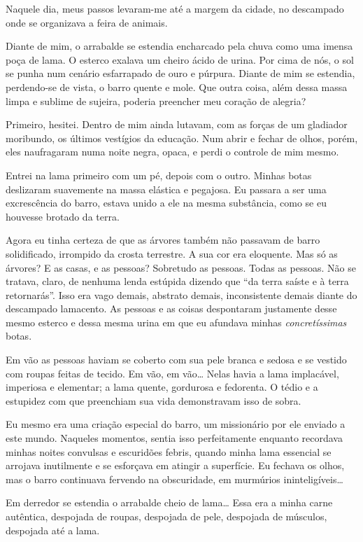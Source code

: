Naquele dia, meus passos levaram-me até a margem da cidade, no descampado onde se organizava a feira de animais.

Diante de mim, o arrabalde se estendia encharcado pela chuva como uma imensa poça de lama. O esterco exalava um cheiro ácido de urina. Por cima de nós, o sol se punha num cenário esfarrapado de ouro e púrpura. Diante de mim se estendia, perdendo-se de vista, o barro quente e mole. Que outra coisa, além dessa massa limpa e sublime de sujeira, poderia preencher meu coração de alegria?

Primeiro, hesitei. Dentro de mim ainda lutavam, com as forças de um gladiador moribundo, os últimos vestígios da educação. Num abrir e fechar de olhos, porém, eles naufragaram numa noite negra, opaca, e perdi o controle de mim mesmo.

Entrei na lama primeiro com um pé, depois com o outro. Minhas botas deslizaram suavemente na massa elástica e pegajosa. Eu passara a ser uma excrescência do barro, estava unido a ele na mesma substância, como se eu houvesse brotado da terra.

Agora eu tinha certeza de que as árvores também não passavam de barro solidificado, irrompido da crosta terrestre. A sua cor era eloquente. Mas só as árvores? E as casas, e as pessoas? Sobretudo as pessoas. Todas as pessoas. Não se tratava, claro, de nenhuma lenda estúpida dizendo que ``da terra saíste e à terra retornarás''. Isso era vago demais, abstrato demais, inconsistente demais diante do descampado lamacento. As pessoas e as coisas despontaram justamente desse mesmo esterco e dessa mesma urina em que eu afundava minhas \textit{concretíssimas} botas.

Em vão as pessoas haviam se coberto com sua pele branca e sedosa e se vestido com roupas feitas de tecido. Em vão, em vão\ldots{} Nelas havia a lama implacável, imperiosa e elementar; a lama quente, gordurosa e fedorenta. O tédio e a estupidez com que preenchiam sua vida demonstravam isso de sobra.

Eu mesmo era uma criação especial do barro, um missionário por ele enviado a este mundo. Naqueles momentos, sentia isso perfeitamente enquanto recordava minhas noites convulsas e escuridões febris, quando minha lama essencial se arrojava inutilmente e se esforçava em atingir a superfície. Eu fechava os olhos, mas o barro continuava fervendo na obscuridade, em murmúrios ininteligíveis\ldots{}

Em derredor se estendia o arrabalde cheio de lama\ldots{} Essa era a minha carne autêntica, despojada de roupas, despojada de pele, despojada de músculos, despojada até a lama.

